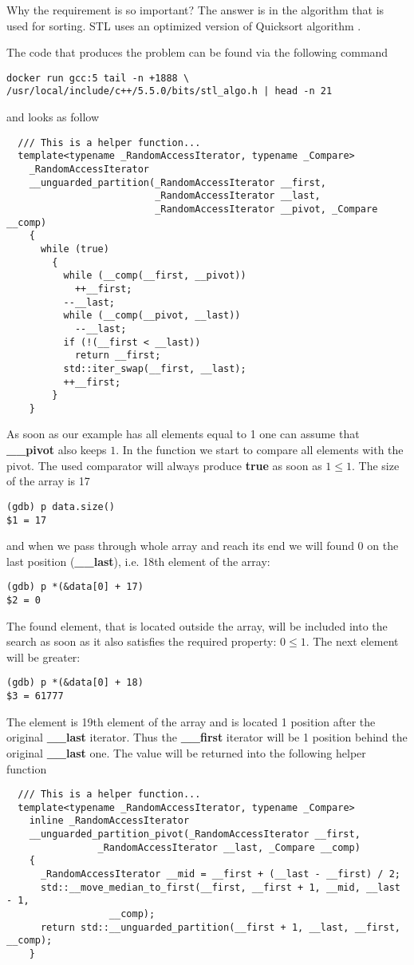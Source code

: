 \documentclass[14pt,a4paper]{article}
\begin{document}
Why the requirement is so important? The answer is in the algorithm
that is used for sorting. STL uses an optimized version of Quicksort algorithm
\cite{wiki:quicksort}. 

The code that produces the problem can be found via the following command
\begin{verbatim}
docker run gcc:5 tail -n +1888 \
/usr/local/include/c++/5.5.0/bits/stl_algo.h | head -n 21
\end{verbatim}
and looks as follow
\begin{verbatim}
  /// This is a helper function...
  template<typename _RandomAccessIterator, typename _Compare>
    _RandomAccessIterator
    __unguarded_partition(_RandomAccessIterator __first,
                          _RandomAccessIterator __last,
                          _RandomAccessIterator __pivot, _Compare __comp)
    {
      while (true)
        {
          while (__comp(__first, __pivot))
            ++__first;
          --__last;
          while (__comp(__pivot, __last))
            --__last;
          if (!(__first < __last))
            return __first;
          std::iter_swap(__first, __last);
          ++__first;
        }
    }
\end{verbatim}
As soon as our example has all elements equal to 1 one can assume
that \textbf{\_\_pivot} also keeps $1$. In the function we start to
compare all elements with the pivot. The used comparator will always
produce \textbf{true} as soon 
as $1 \le 1$. The size of the array is 17 
\begin{verbatim}
(gdb) p data.size()
$1 = 17
\end{verbatim}
and when we pass through whole array and reach its end we
will found $0$ on the last position (\textbf{\_\_last}), i.e. 18th
element of the array: 
\begin{verbatim}
(gdb) p *(&data[0] + 17)
$2 = 0
\end{verbatim}
The found element, that is located outside the array, will be
included into the search as soon as it also satisfies the required
property: $0 \le 1$. The next element will be greater:  
\begin{verbatim}
(gdb) p *(&data[0] + 18)
$3 = 61777
\end{verbatim}
The element is 19th element of the array and is located 1 position
after the original \textbf{\_\_last} iterator. Thus the \textbf{\_\_first}
iterator will be 1 position behind the original \textbf{\_\_last} one.
The value will be returned into the following helper 
function 
\begin{verbatim}
  /// This is a helper function...
  template<typename _RandomAccessIterator, typename _Compare>
    inline _RandomAccessIterator
    __unguarded_partition_pivot(_RandomAccessIterator __first,
				_RandomAccessIterator __last, _Compare __comp)
    {
      _RandomAccessIterator __mid = __first + (__last - __first) / 2;
      std::__move_median_to_first(__first, __first + 1, __mid, __last - 1,
				  __comp);
      return std::__unguarded_partition(__first + 1, __last, __first, __comp);
    }
\end{verbatim}
\end{document}
